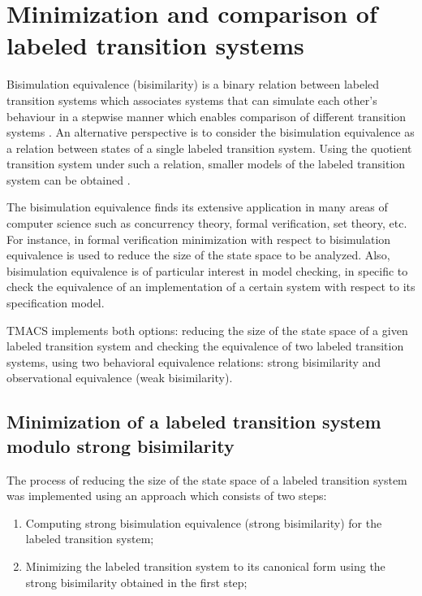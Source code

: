\section{Minimization and comparison of labeled transition systems}
\label{sec:bisimulation}

Bisimulation equivalence (bisimilarity) \cite{Park} is a binary relation between labeled transition systems which associates systems that can simulate each other's behaviour in a stepwise manner which enables comparison of different transition systems \cite{ModelChecking}. An alternative perspective is to consider the bisimulation equivalence as a relation between states of a single labeled transition system. Using the quotient transition system under such a relation, smaller models of the labeled transition system can be obtained \cite{ModelChecking}.

The bisimulation equivalence finds its extensive application in many areas of computer science such as concurrency theory, formal verification, set theory, etc. For instance, in formal verification minimization with respect to bisimulation equivalence is used to reduce the size of the state space to be analyzed. Also, bisimulation equivalence is of particular interest in model checking, in specific to check the equivalence of an implementation of a certain system with respect to its specification model.

TMACS implements both options: reducing the size of the state space of a given labeled transition system and checking the equivalence of two labeled transition systems, using two behavioral equivalence relations: strong bisimilarity and observational equivalence (weak bisimilarity).

\subsection{Minimization of a labeled transition system modulo strong bisimilarity}
The process of reducing the size of the state space of a labeled transition system was implemented using an approach which consists of two steps:
\begin{enumerate}
\item Computing strong bisimulation equivalence (strong bisimilarity) for the labeled transition system;
\item Minimizing the labeled transition system to its canonical form using the strong bisimilarity obtained in the first step;
\end{enumerate}

